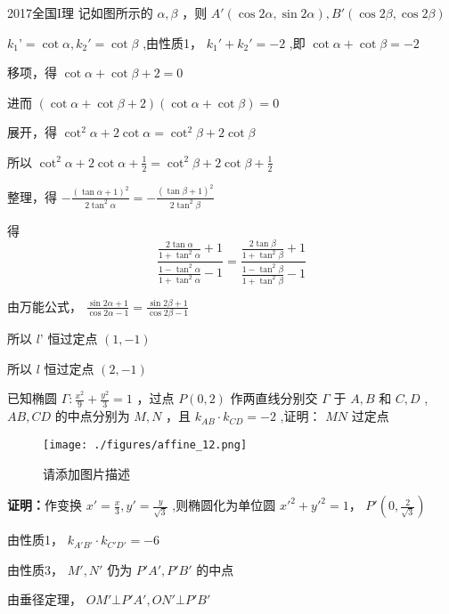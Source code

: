 \begin{corollary}{}
\begin{example}{2017全国I理}
记如图所示的 $\displaystyle{\alpha,\beta}$ ，则 $\displaystyle{A'(\cos2\alpha,\sin2\alpha),B'(\cos2\beta,\cos2\beta)}$

$\displaystyle{k_1’=\cot{\alpha},k_2'=\cot{\beta}}$ ,由性质1， $\displaystyle{k_1'+k_2'=-2}$ ,即 $\displaystyle{\cot{\alpha}+\cot{\beta}=-2}$

移项，得 $\displaystyle{\cot\alpha+\cot \beta+2=0}$

进而 $\displaystyle{(\cot\alpha+\cot \beta+2)(\cot \alpha+\cot\beta)=0}$

展开，得 $\displaystyle{\cot^2\alpha+2\cot\alpha=\cot^2\beta+2\cot\beta}$

所以 $\displaystyle{\cot^2\alpha+2\cot\alpha+\frac{1}{2}=\cot^2\beta+2\cot\beta+\frac{1}{2}}$

整理，得 $\displaystyle{-\frac{(\tan\alpha+1)^2}{2\tan^2\alpha}=-\frac{(\tan\beta+1)^2}{2\tan^2\beta}}$

得 
$$\frac{\frac{2\tan\alpha}{1+\tan^2\alpha}+1}{\frac{1-\tan^2\alpha}{1+\tan^2\alpha}-1}=\frac{\frac{2\tan\beta}{1+\tan^2\beta}+1}{\frac{1-\tan^2\beta}{1+\tan^2\beta}-1}$$

由万能公式， $\displaystyle{\frac{\sin2\alpha+1}{\cos2\alpha-1}=\frac{\sin2\beta+1}{\cos2\beta-1}}$

所以 $\displaystyle{l’}$ 恒过定点 $\displaystyle{(1,-1)}$

所以 $\displaystyle{l}$ 恒过定点 $\displaystyle{(2,-1)}$ 
\end{example}
\begin{example}{}
 已知椭圆 $\displaystyle{\Gamma:\frac{x^2}{9}+\frac{y^2}{3}=1}$ ，过点 $\displaystyle{P(0,2)}$ 作两直线分别交 $\displaystyle{\Gamma}$ 于 $\displaystyle{A,B}$ 和 $\displaystyle{C,D}$ , $\displaystyle{AB,CD}$ 的中点分别为 $\displaystyle{M,N}$ ，且 $\displaystyle{k_{AB}\cdot k_{CD}=-2}$ ,证明： $\displaystyle{MN}$ 过定点
\begin{figure}[ht]
\centering
\texttt{[image: ./figures/affine\_12.png]}
\caption{请添加图片描述} \label{affine_fig12}
\end{figure}
\textbf{证明：}作变换 $\displaystyle{x'=\frac{x}{3},y'=\frac{y}{\sqrt{3}}}$ ,则椭圆化为单位圆 $\displaystyle{x'^2+y'^2=1}$， $\displaystyle{P'\left(0,\frac{2}{\sqrt{3}}\right)}$

由性质1， $\displaystyle{k_{A'B'}\cdot k_{C'D'}=-6}$

由性质3， $\displaystyle{M',N'}$ 仍为 $\displaystyle{P'A',P'B'}$ 的中点

由垂径定理， $\displaystyle{OM'\bot P'A',ON'\bot P'B'}$


\end{example}
\end{corollary}
